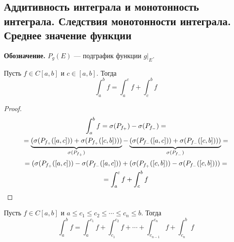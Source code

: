 \subsection{Аддитивность интеграла и монотонность интеграла. Следствия монотонности интеграла. Среднее значение функции}
\textbf{Обозначение.}
$P_{g}(E)$ --- подграфик функции $g|_{E}$.

\begin{theorem}
    Пусть $f \in C[a, b]$ и $c \in [a, b]$. Тогда
    \begin{equation*}
        \int_{a}^{b} f = \int_{a}^{c} f + \int_{c}^{b} f
    \end{equation*}
\end{theorem}
\begin{proof}
    \begin{equation*}
        \begin{gathered}
             \int_{a}^{b} f = \sigma(P_{f_{+}}) - \sigma(P_{f_{-}})
             = \\ =
             \underbrace{(\sigma(P_{f_{+}}([a, c])) +
             \sigma(P_{f_{+}}([c, b])))}_{\mathclap{\sigma(P_{f_{+}})}} -
             \underbrace{(\sigma(P_{f_{-}}([a, c])) +
             \sigma(P_{f_{-}}([c, b])))}_{\mathclap{\sigma(P_{f_{-}})}}
             = \\ =
             (\sigma(P_{f_{+}}([a, c])) -
             \sigma(P_{f_{-}}([a, c])) +
             (\sigma(P_{f_{+}}([c, b])) -
             \sigma(P_{f_{-}}([c, b])))
             = \\ =
             \int_{a}^{c} f + \int_{c}^{b} f
         \end{gathered}
    \end{equation*}
\end{proof}

\begin{follow}
    Пусть $f \in C[a, b]$ и $a \leq c_1 \leq c_2 \leq \dotsb \leq c_n \leq b$. Тогда
    \begin{equation*}
    \int_{a}^{b} f =
    \int_{a}^{c_1} f +
    \int_{c_1}^{c_2} f +
    \dotsb +
    \int_{c_{n - 1}}^{c_n} f +
    \int_{c_n}^{b} f
    \end{equation*}
\end{follow}

